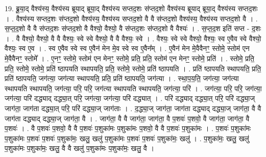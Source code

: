 \documentclass[17pt]{extarticle}
\begin{document}
19. ब्रू॒या॒द् वैश्य॑स्य॒ वैश्य॑स्य ब्रूयाद् ब्रूया॒द् वैश्य॑स्य सप्तद॒शः स॑प्तद॒शो वैश्य॑स्य ब्रूयाद् ब्रूया॒द् वैश्य॑स्य सप्तद॒शः । . वैश्य॑स्य सप्तद॒शः स॑प्तद॒शो वैश्य॑स्य॒ वैश्य॑स्य सप्तद॒शो वै वै स॑प्तद॒शो वैश्य॑स्य॒ वैश्य॑स्य सप्तद॒शो वै । . स॒प्त॒द॒शो वै वै स॑प्तद॒शः स॑प्तद॒शो वै वैश्यो॒ वैश्यो॒ वै स॑प्तद॒शः स॑प्तद॒शो वै वैश्यः॑ । . स॒प्त॒द॒श इति॑ सप्त - द॒शः । . वै वैश्यो॒ वैश्यो॒ वै वै वैश्यः॒ स्वे स्वे वैश्यो॒ वै वै वैश्यः॒ स्वे । . वैश्यः॒ स्वे स्वे वैश्यो॒ वैश्यः॒ स्व ए॒वैव स्वे वैश्यो॒ वैश्यः॒ स्व ए॒व । . स्व ए॒वैव स्वे स्व ए॒वैन॑ मेन मे॒व स्वे स्व ए॒वैन᳚म् । . ए॒वैन॑ मेन मे॒वैवैनꣳ॒॒ स्तोमे॒ स्तोम॑ एन मे॒वैवैनꣳ॒॒ स्तोमे᳚ । . ए॒नꣳ॒॒ स्तोमे॒ स्तोम॑ एन मेनꣳ॒॒ स्तोमे॒ प्रति॒ प्रति॒ स्तोम॑ एन मेनꣳ॒॒ स्तोमे॒ प्रति॑ । . स्तोमे॒ प्रति॒ प्रति॒ स्तोमे॒ स्तोमे॒ प्रति॑ ष्ठापयति स्थापयति॒ प्रति॒ स्तोमे॒ स्तोमे॒ प्रति॑ ष्ठापयति । . प्रति॑ ष्ठापयति स्थापयति॒ प्रति॒ प्रति॑ ष्ठापयति॒ जग॑त्या॒ जग॑त्या स्थापयति॒ प्रति॒ प्रति॑ ष्ठापयति॒ जग॑त्या । . स्था॒प॒य॒ति॒ जग॑त्या॒ जग॑त्या स्थापयति स्थापयति॒ जग॑त्या॒ परि॒ परि॒ जग॑त्या स्थापयति स्थापयति॒ जग॑त्या॒ परि॑ । . जग॑त्या॒ परि॒ परि॒ जग॑त्या॒ जग॑त्या॒ परि॑ दद्ध्याद् दद्ध्या॒त् परि॒ जग॑त्या॒ जग॑त्या॒ परि॑ दद्ध्यात् । . परि॑ दद्ध्याद् दद्ध्या॒त् परि॒ परि॑ दद्ध्या॒ज् जाग॑ता॒ जाग॑ता दद्ध्या॒त् परि॒ परि॑ दद्ध्या॒ज् जाग॑ताः । . द॒द्ध्या॒ज् जाग॑ता॒ जाग॑ता दद्ध्याद् दद्ध्या॒ज् जाग॑ता॒ वै वै जाग॑ता दद्ध्याद् दद्ध्या॒ज् जाग॑ता॒ वै । . जाग॑ता॒ वै वै जाग॑ता॒ जाग॑ता॒ वै प॒शवः॑ प॒शवो॒ वै जाग॑ता॒ जाग॑ता॒ वै प॒शवः॑ । . वै प॒शवः॑ प॒शवो॒ वै वै प॒शवः॑ प॒शुका॑मः प॒शुका॑मः प॒शवो॒ वै वै प॒शवः॑ प॒शुका॑मः । . प॒शवः॑ प॒शुका॑मः प॒शुका॑मः प॒शवः॑ प॒शवः॑ प॒शुका॑मः॒ खलु॒ खलु॑ प॒शुका॑मः प॒शवः॑ प॒शवः॑ प॒शुका॑मः॒ खलु॑ । . प॒शुका॑मः॒ खलु॒ खलु॑ प॒शुका॑मः प॒शुका॑मः॒ खलु॒ वै वै खलु॑ प॒शुका॑मः प॒शुका॑मः॒ खलु॒ वै । \newline
\end{document}
